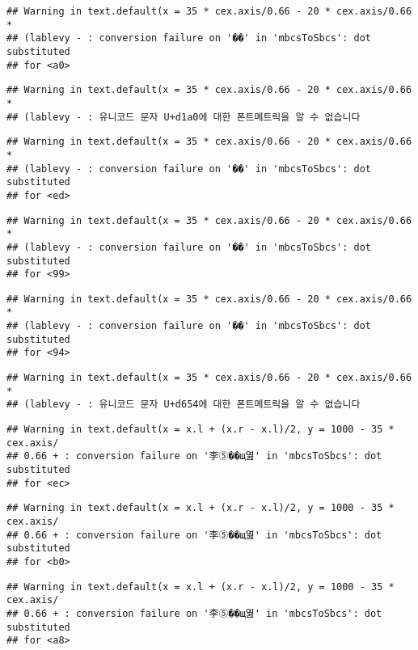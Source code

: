 \documentclass[]{article}
\begin{document}
\begin{verbatim}
## Warning in text.default(x = 35 * cex.axis/0.66 - 20 * cex.axis/0.66 *
## (lablevy - : conversion failure on '��' in 'mbcsToSbcs': dot substituted
## for <a0>
\end{verbatim}

\begin{verbatim}
## Warning in text.default(x = 35 * cex.axis/0.66 - 20 * cex.axis/0.66 *
## (lablevy - : 유니코드 문자 U+d1a0에 대한 폰트메트릭을 알 수 없습니다
\end{verbatim}

\begin{verbatim}
## Warning in text.default(x = 35 * cex.axis/0.66 - 20 * cex.axis/0.66 *
## (lablevy - : conversion failure on '��' in 'mbcsToSbcs': dot substituted
## for <ed>
\end{verbatim}

\begin{verbatim}
## Warning in text.default(x = 35 * cex.axis/0.66 - 20 * cex.axis/0.66 *
## (lablevy - : conversion failure on '��' in 'mbcsToSbcs': dot substituted
## for <99>
\end{verbatim}

\begin{verbatim}
## Warning in text.default(x = 35 * cex.axis/0.66 - 20 * cex.axis/0.66 *
## (lablevy - : conversion failure on '��' in 'mbcsToSbcs': dot substituted
## for <94>
\end{verbatim}

\begin{verbatim}
## Warning in text.default(x = 35 * cex.axis/0.66 - 20 * cex.axis/0.66 *
## (lablevy - : 유니코드 문자 U+d654에 대한 폰트메트릭을 알 수 없습니다
\end{verbatim}

\begin{verbatim}
## Warning in text.default(x = x.l + (x.r - x.l)/2, y = 1000 - 35 * cex.axis/
## 0.66 + : conversion failure on '李⑤��щ엺' in 'mbcsToSbcs': dot substituted
## for <ec>
\end{verbatim}

\begin{verbatim}
## Warning in text.default(x = x.l + (x.r - x.l)/2, y = 1000 - 35 * cex.axis/
## 0.66 + : conversion failure on '李⑤��щ엺' in 'mbcsToSbcs': dot substituted
## for <b0>
\end{verbatim}

\begin{verbatim}
## Warning in text.default(x = x.l + (x.r - x.l)/2, y = 1000 - 35 * cex.axis/
## 0.66 + : conversion failure on '李⑤��щ엺' in 'mbcsToSbcs': dot substituted
## for <a8>
\end{verbatim}
\end{document}

